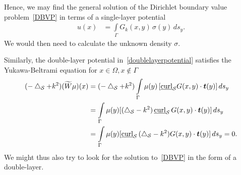 Hence, we may find the general solution of the Dirichlet boundary value
problem~\eqref{DBVP} in terms of a single-layer potential
\begin{align*}
  u(x) & =  \int\limits_\Gamma G_k(x,y) \,\sigma(y) \,ds_{y}. 
\end{align*}
We would then need to calculate the unknown density $\sigma$.
 
Similarly, the double-layer potential in~\eqref{doublelayerpotential}
satisfies the Yukawa-Beltrami equation for $x\in \Omega, x\notin\Gamma$
\begin{align*}
  (-\lap_{\S} + k^2)(\widetilde{W}\mu)(x) & = (-\lap_{\S}+k^2)
  \int\limits_\Gamma \mu(y)\, [\underline{\mbox{curl}}_{\S}
  G(x,y)\cdot\vec{t}(y)]\,ds_{y} \\
  &=\int\limits_\Gamma \mu(y)
  [(\lap_{\S}-k^2)\,\underline{\mbox{curl}}_{\S}\,
  G(x,y)\cdot\vec{t}(y)]\,ds_{y} \\ 
  &=\int\limits_\Gamma \mu(y) [\underline{\mbox{curl}}_{\S} \,
  (\lap_{\S} -k^2)G(x,y)\cdot\vec{t}(y)]\,ds_{y} = 0.
\end{align*}
We might thus also try to look for the solution to~\eqref{DBVP} in the
form of a double-layer.



